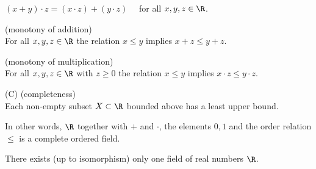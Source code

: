\begin{definition}
\begin{axiomlist}[D]
    $ (x +y ) \cdot z = (x \cdot z) +  (y \cdot z) \quad $ for all $x,y,z\in \R$.
  \end{axiomlist} 
  \begin{axiomlist}[O]
  \setcounter{enumi}{4}
  \item \textup{\sffamily (monotony of addition)}\\
  For all $x,y,z \in \R$ the relation $x \leq y$ implies $x +z \leq y+z$. 
  \item \textup{\sffamily (monotony of multiplication)}\\
  For all $x,y,z \in \R$ with $z \geq 0$ the relation $x \leq y$ implies $x \cdot z \leq y \cdot z$. 
  \end{axiomlist} 
  \begin{axiomlist}[C]
  \item[\textup{\sffamily (C) }]  \textup{\sffamily (completeness)}\\
  Each non-empty subset $X\subset \R$ bounded above has a least upper bound. 
  \end{axiomlist} 
  In other words, $\R$ together with $+$ and $\cdot$, the elements $0,1$ and the order relation $\leq$ 
  is a complete ordered field.  
\end{definition}

\begin{theorem}
  There exists (up to isomorphism) only one field of real numbers $\R$. 
\end{theorem}